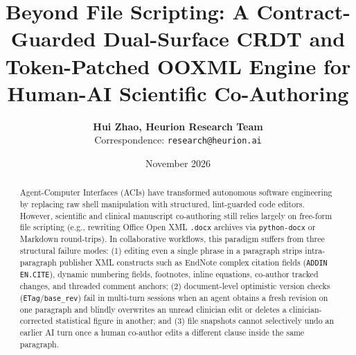 \documentclass[11pt,a4paper]{article}
\title{\textbf{Beyond File Scripting: A Contract-Guarded Dual-Surface CRDT and Token-Patched OOXML Engine for Human-AI Scientific Co-Authoring}}
\author{
  \textbf{Hui Zhao, Heurion Research Team} \\
  \small Correspondence: \texttt{research@heurion.ai}
}
\date{November 2026}
\begin{document}
\maketitle

\begin{abstract}
Agent-Computer Interfaces (ACIs) have transformed autonomous software engineering by replacing raw shell manipulation with structured, lint-guarded code editors. However, scientific and clinical manuscript co-authoring still relies largely on free-form file scripting (e.g., rewriting Office Open XML \texttt{.docx} archives via \texttt{python-docx} or Markdown round-trips). In collaborative workflows, this paradigm suffers from three structural failure modes: (1) editing even a single phrase in a paragraph strips intra-paragraph publisher XML constructs such as EndNote complex citation fields (\texttt{ADDIN EN.CITE}), dynamic numbering fields, footnotes, inline equations, co-author tracked changes, and threaded comment anchors; (2) document-level optimistic version checks (\texttt{ETag}/\texttt{base\_rev}) fail in multi-turn sessions when an agent obtains a fresh revision on one paragraph and blindly overwrites an unread clinician edit or deletes a clinician-corrected statistical figure in another; and (3) file snapshots cannot selectively undo an earlier AI turn once a human co-author edits a different clause inside the same paragraph.


\end{abstract}
\end{document}
